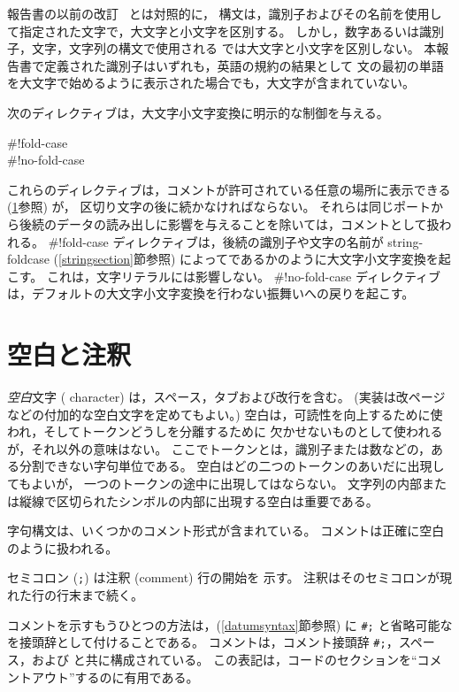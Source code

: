 報告書の以前の改訂~\cite{R5RS} とは対照的に，
構文は，識別子およびその名前を使用して指定された文字で，大文字と小文字を区別する。
しかし，数字あるいは識別子，文字，文字列の構文で使用される
では大文字と小文字を区別しない。
本報告書で定義された識別子はいずれも，英語の規約の結果として
文の最初の単語を大文字で始めるように表示された場合でも，大文字が含まれていない。

次のディレクティブは，大文字小文字変換に明示的な制御を与える。

\begin{entry}{%
{\cf{}\#!fold-case}\\
{\cf{}\#!no-fold-case}}

これらのディレクティブは，コメントが許可されている任意の場所に表示できる (\ref{wscommentsection}参照) が，
区切り文字の後に続かなければならない。
それらは同じポートから後続のデータの読み出しに影響を与えることを除いては，コメントとして扱われる。
{\cf{}\#!fold-case} ディレクティブは，後続の識別子や文字の名前が
{\cf string-foldcase} (\ref{stringsection}節参照) によってであるかのように大文字小文字変換を起こす。
これは，文字リテラルには影響しない。
{\cf{}\#!no-fold-case} ディレクティブは，デフォルトの大文字小文字変換を行わない振舞いへの戻りを起こす。
\end{entry}



\section{空白と注釈}
\label{wscommentsection}

{\em 空白}文字 ( character) は，スペース，タブおよび改行を含む。
(実装は改ページなどの付加的な空白文字を定めてもよい。)
空白は，可読性を向上するために使われ，そしてトークンどうしを分離するために
欠かせないものとして使われるが，それ以外の意味はない。
ここでトークンとは，識別子または数などの，ある分割できない字句単位である。
空白はどの二つのトークンのあいだに出現してもよいが，
一つのトークンの途中に出現してはならない。
文字列の内部または縦線で区切られたシンボルの内部に出現する空白は重要である。

字句構文は、いくつかのコメント形式が含まれている。
コメントは正確に空白のように扱われる。

セミコロン ({\tt;}) は注釈 (comment) 行の開始を
示す。\mainschindex{;}
注釈はそのセミコロンが現れた行の行末まで続く。

コメントを示すもうひとつの方法は，(\ref{datumsyntax}節参照) に
{\tt \#;}\sharpindex{;} と省略可能な  を接頭辞として付けることである。
コメントは，コメント接頭辞 {\tt \#;}，スペース，および  と共に構成されている。
この表記は，コードのセクションを``コメントアウト''するのに有用である。


